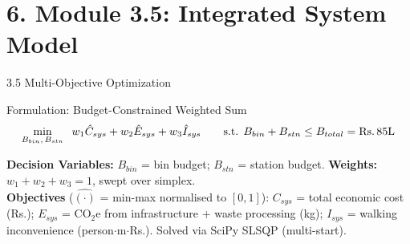 \documentclass[aspectratio=169]{beamer}
\begin{document}
\section{6. Module 3.5: Integrated System Model}

\begin{frame}{3.5 Multi-Objective Optimization}
    \vspace{-0.15cm}
    \begin{alertblock}{Formulation: Budget-Constrained Weighted Sum}
        \vspace{-0.2cm}
        $$ \min_{B_{bin},\, B_{stn}} \;\; w_1 \hat{C}_{sys} + w_2 \hat{E}_{sys} + w_3 \hat{I}_{sys} \qquad \text{s.t. } B_{bin} + B_{stn} \le B_{total} = \text{Rs.\,85L} $$
        \vspace{-0.3cm}
    \end{alertblock}
    \vspace{-0.1cm}
    \scriptsize
    \textbf{Decision Variables:} $B_{bin}$ = bin budget; $B_{stn}$ = station budget. \quad \textbf{Weights:} $w_1 + w_2 + w_3 = 1$, swept over simplex.\\
    \textbf{Objectives} ($\hat{(\cdot)}$ = min-max normalised to $[0,1]$):
    $C_{sys}$ = total economic cost (Rs.); \;
    $E_{sys}$ = CO$_2$e from infrastructure + waste processing (kg); \;
    $I_{sys}$ = walking inconvenience (person$\cdot$m$\cdot$Rs.). \; Solved via SciPy SLSQP (multi-start).


\end{frame}
\end{document}
